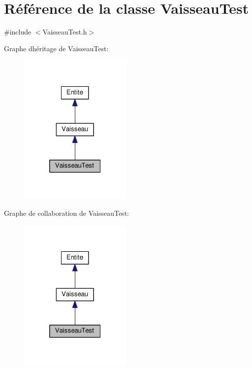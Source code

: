 \hypertarget{class_vaisseau_test}{}\section{Référence de la classe Vaisseau\+Test}
\label{class_vaisseau_test}


{\ttfamily \#include $<$Vaisseau\+Test.\+h$>$}



Graphe d\textquotesingle{}héritage de Vaisseau\+Test\+:
\nopagebreak
\begin{figure}[H]
\begin{center}
\leavevmode
\includegraphics[width=157pt]{class_vaisseau_test__inherit__graph}
\end{center}
\end{figure}


Graphe de collaboration de Vaisseau\+Test\+:
\nopagebreak
\begin{figure}[H]
\begin{center}
\leavevmode
\includegraphics[width=157pt]{class_vaisseau_test__coll__graph}
\end{center}
\end{figure}
